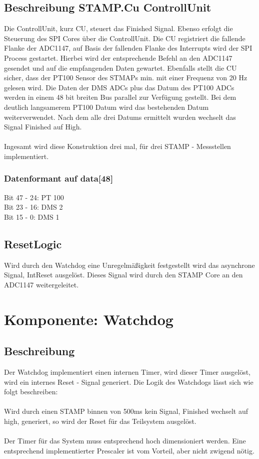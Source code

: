 \subsection{Beschreibung STAMP.Cu ControllUnit} 
Die ControllUnit, kurz CU, steuert das Finished Signal. Ebenso erfolgt die Steuerung des SPI Cores über die ControllUnit.  Die CU registriert die fallende Flanke der ADC1147, auf Basis der fallenden Flanke des Interrupts wird der SPI Process gestartet. Hierbei wird der entsprechende Befehl an den ADC1147 gesendet und auf die empfangenden Daten gewartet. Ebenfalls stellt die CU sicher, dass der PT100 Sensor des STMAPs min. mit einer Frequenz von 20 Hz gelesen wird. Die Daten der DMS ADCs plus das Datum des PT100 ADCs werden in einem 48 bit breiten Bus parallel zur Verfügung gestellt. Bei dem deutlich langsamerem PT100 Datum wird das bestehenden Datum weiterverwendet. Nach dem alle drei Datums ermittelt wurden wechselt das Signal Finished auf High. \\\\
Ingesamt wird diese Konstruktion drei mal, für drei STAMP - Messstellen implementiert. 
\subsubsection{Datenformant auf data[48]}
Bit 47 - 24: PT 100 \\
Bit 23 - 16: DMS 2 \\
Bit 15 - 0: DMS 1 
\subsection{ResetLogic}
Wird durch den Watchdog eine Unregelmäßigkeit festgestellt wird das asynchrone Signal, IntReset ausgelöst. Dieses Signal wird durch den STAMP Core an den ADC1147 weitergeleitet. 
\section{Komponente: Watchdog}
\subsection{Beschreibung}
Der Watchdog implementiert einen internen Timer, wird dieser Timer ausgelöst, wird ein internes Reset - Signal generiert. Die Logik des Watchdogs lässt sich wie folgt beschreiben: \\\\
Wird durch einen STAMP binnen von 500ms kein Signal, Finished wechselt auf high, generiert, so wird der Reset für das Teilsystem ausgelöst. 
\\\\
Der Timer für das System muss entsprechend hoch dimensioniert werden. Eine entsprechend implementierter Prescaler ist vom Vorteil, aber nicht zwigend nötig.
